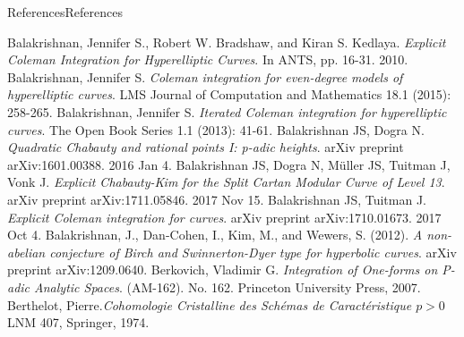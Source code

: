 \documentclass[10pt,]{book}
\numberwithin{equation}{section}
\newcommand{\gt}{>}
\begin{document}
%
\backmatter
%
%
%
%
%
\typeout{************************************************}
\typeout{************************************************}
%
\begin{references-chapter-numberless}{References}{}{References}{}{}\hypertarget{references-1}{}
\begin{thebibliography}{9}
\hypertarget{bib-balakrishnan-bradshaw-kedlaya}{}Balakrishnan, Jennifer S., Robert W. Bradshaw, and Kiran S. Kedlaya. \textit{Explicit Coleman Integration for Hyperelliptic Curves}. In ANTS, pp. 16-31. 2010.
\hypertarget{bib-balakrishnan-even}{}Balakrishnan, Jennifer S. \textit{Coleman integration for even-degree models of hyperelliptic curves}. LMS Journal of Computation and Mathematics 18.1 (2015): 258-265.
\hypertarget{bib-balakrishnan-iterated}{}Balakrishnan, Jennifer S. \textit{Iterated Coleman integration for hyperelliptic curves}. The Open Book Series 1.1 (2013): 41-61.
\hypertarget{bib-balakrishnan-dogra}{}Balakrishnan JS, Dogra N. \textit{Quadratic Chabauty and rational points I: p-adic heights}. arXiv preprint arXiv:1601.00388. 2016 Jan 4.
\hypertarget{bib-balakrishnan-dogra-muller-tuitman-vonk}{}Balakrishnan JS, Dogra N, Müller JS, Tuitman J, Vonk J. \textit{Explicit Chabauty-Kim for the Split Cartan Modular Curve of Level 13}. arXiv preprint arXiv:1711.05846. 2017 Nov 15.
\hypertarget{bib-balakrishnan-tuitman}{}Balakrishnan JS, Tuitman J. \textit{Explicit Coleman integration for curves}. arXiv preprint arXiv:1710.01673. 2017 Oct 4.
\hypertarget{bib-bala-nonab}{}Balakrishnan, J., Dan-Cohen, I., Kim, M., and Wewers, S. (2012). \textit{A non-abelian conjecture of Birch and Swinnerton-Dyer type for hyperbolic curves}. arXiv preprint arXiv:1209.0640.
\hypertarget{bib-berkovich}{}Berkovich, Vladimir G.  \textit{Integration of One-forms on P-adic Analytic Spaces}. (AM-162). No. 162. Princeton University Press, 2007.
\hypertarget{bib-berth1}{}Berthelot, Pierre.\textit{Cohomologie Cristalline des Schémas de Caractéristique \(p\gt 0\)} LNM 407, Springer, 1974.

\end{thebibliography}
\end{references-chapter-numberless}
\end{document}

